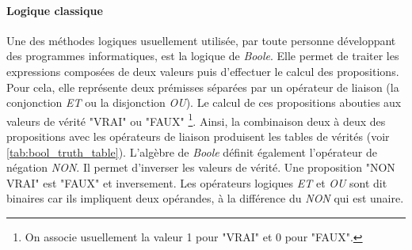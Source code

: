 \begin{refsegment}
    \paragraph{Logique classique}
    
    Une des méthodes logiques usuellement utilisée, par toute personne développant des programmes informatiques, est la logique de \textit{Boole}. Elle permet de traiter les expressions composées de deux valeurs puis d'effectuer le calcul des propositions. Pour cela, elle représente deux prémisses séparées par un opérateur de liaison (la conjonction \textit{ET} ou la disjonction \textit{OU}). Le calcul de ces propositions abouties aux valeurs de vérité "VRAI" ou "FAUX" \footnote{On associe usuellement la valeur 1 pour "VRAI" et 0 pour "FAUX".}. Ainsi, la combinaison deux à deux des propositions avec les opérateurs de liaison produisent les tables de vérités (voir \cref{tab:bool_truth_table}). L'algèbre de \textit{Boole} définit également l'opérateur de négation \textit{NON}. Il permet d'inverser les valeurs de vérité. Une proposition "NON VRAI" est "FAUX" et inversement. Les opérateurs logiques \textit{ET} et \textit{OU} sont dit binaires car ils impliquent deux opérandes, à la différence du \textit{NON} qui est unaire.
    

\end{refsegment}
